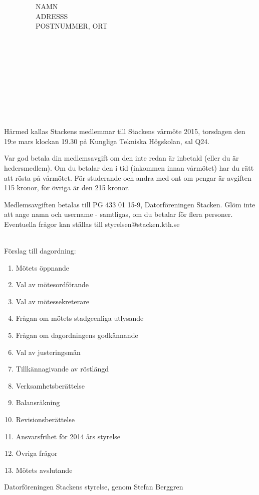 \documentclass[a4paper,SN]{scrlttr2}
\begin{document}
\begin{letter}{%
~~~~~~~~~NAMN \\
~~~~~~~~~ADRESSS \\
~~~~~~~~~POSTNUMMER, ORT\\
~\\
~\\
~\\
~\\
~\\ 
~\\
~\\
~\\
~}

\opening{}

Härmed kallas Stackens medlemmar till Stackens vårmöte 2015, torsdagen den 19:e mars klockan 19.30 på Kungliga Tekniska Högskolan, sal Q24.  

Var god betala din medlemsavgift om den inte redan är inbetald (eller du är hedersmedlem). Om du betalar den i tid (inkommen innan vårmötet) har du rätt att rösta på vårmötet. För studerande och andra med ont om pengar är avgiften 115 kronor, för övriga är den 215 kronor.

Medlemsavgiften betalas till PG 433 01 15-9, Datorföreningen Stacken. Glöm inte att ange namn och username - samtligas, om du betalar för flera personer. Eventuella frågor kan ställas till styrelsen@stacken.kth.se

~\\
Förslag till dagordning:

\begin{multicols}{2}
\begin{enumerate}
	\item  Mötets öppnande
	\item  Val av mötesordförande
	\item  Val av mötessekreterare
	\item  Frågan om mötets stadgeenliga utlysande
	\item  Frågan om dagordningens godkännande
	\item  Val av justeringsmän
	\item  Tillkännagivande av röstlängd
	\item  Verksamhetsberättelse
	\item  Balansräkning
	\item  Revisionsberättelse
	\item  Ansvarsfrihet för 2014 års styrelse
	\item  Övriga frågor
	\item  Mötets avslutande
\end{enumerate}
\end{multicols}

Datorföreningen Stackens styrelse, genom Stefan Berggren

\closing{} 

\end{letter}
\end{document}
